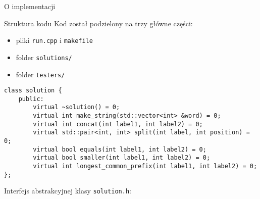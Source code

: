 \documentclass[polish]{beamer}
\begin{document}
\begin{frame}[fragile]{O implementacji}
    \begin{block}{Struktura kodu}
        Kod został podzielony na trzy główne części: \pause
        \begin{itemize}
            \item pliki \texttt{run.cpp} i \texttt{makefile} \pause
            \item folder \texttt{solutions/} \pause
            \item folder \texttt{testers/}
        \end{itemize}
    \end{block}
    \pause
    \begin{lrbox}{\thirdbox}
        \begin{lstlisting}[linewidth=18cm]
class solution {
    public:
        virtual ~solution() = 0;
        virtual int make_string(std::vector<int> &word) = 0;
        virtual int concat(int label1, int label2) = 0;
        virtual std::pair<int, int> split(int label, int position) = 0;
        virtual bool equals(int label1, int label2) = 0;
        virtual bool smaller(int label1, int label2) = 0;
        virtual int longest_common_prefix(int label1, int label2) = 0;
};
        \end{lstlisting}
    \end{lrbox}
    Interfejs abstrakcyjnej klasy \texttt{solution.h}:
    \begin{center}
        \vskip 2mm
        \scalebox{0.6}{\usebox{\thirdbox}}
    \end{center}
\end{frame}
\end{document}
